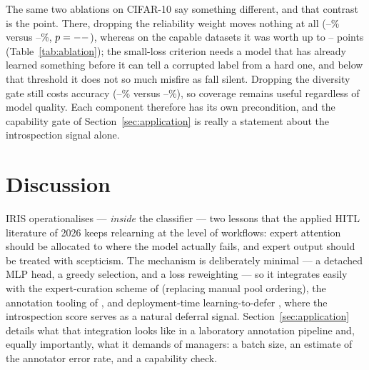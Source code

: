 \documentclass[a4paper,fleqn,longmktitle]{cas-sc}
\newcommand{\method}{IRIS}
\providecommand{\CifarCleanIrisFinal}{--}\providecommand{\CifarCleanIrisFinalStd}{--}
\providecommand{\CifarNoisyIrisFinal}{--}\providecommand{\CifarNoisyIrisFinalStd}{--}
\providecommand{\CifarCleanIrisNodivFinal}{--}\providecommand{\CifarCleanIrisNodivFinalStd}{--}
\providecommand{\CifarNoisyIrisNorelFinal}{--}\providecommand{\CifarNoisyIrisNorelFinalStd}{--}
\providecommand{\FmnistRelOnIrisGain}{--}\providecommand{\FmnistRelOnBadgeGain}{--}\providecommand{\FmnistRelOnBadgeP}{--}\providecommand{\FmnistRelOnBadgeWon}{--}\providecommand{\FmnistNoisyBadgeFinal}{--}\providecommand{\FmnistNoisyBadgeRelFinal}{--}\providecommand{\FmnistNoisyIrisNorelFinal}{--}\providecommand{\FmnistNoisyLearnlossGap}{--}\providecommand{\FmnistNoisyIrisGradFinal}{--}\providecommand{\FmnistNoisyLearnlossFinal}{--}\providecommand{\BloodRelOnIrisGain}{--}\providecommand{\BloodRelOnBadgeGain}{--}\providecommand{\BloodRelOnBadgeP}{--}\providecommand{\BloodRelOnBadgeWon}{--}\providecommand{\BloodNoisyBadgeFinal}{--}\providecommand{\BloodNoisyBadgeRelFinal}{--}\providecommand{\BloodNoisyIrisNorelFinal}{--}\providecommand{\BloodNoisyLearnlossGap}{--}\providecommand{\BloodNoisyIrisGradFinal}{--}\providecommand{\BloodNoisyLearnlossFinal}{--}\providecommand{\CifarRelOnIrisGain}{--}\providecommand{\CifarRelOnBadgeGain}{--}\providecommand{\CifarRelOnBadgeP}{--}\providecommand{\CifarRelOnBadgeWon}{--}\providecommand{\CifarNoisyBadgeFinal}{--}\providecommand{\CifarNoisyBadgeRelFinal}{--}\providecommand{\CifarNoisyIrisNorelFinal}{--}\providecommand{\CifarNoisyLearnlossGap}{--}\providecommand{\CifarNoisyIrisGradFinal}{--}\providecommand{\CifarNoisyLearnlossFinal}{--}
\begin{document}
The same two ablations on CIFAR-10 say something different, and that
contrast is the point. There, dropping the reliability weight moves
nothing at all
(\CifarNoisyIrisNorelFinal\% versus \CifarNoisyIrisFinal\%,
$p=--$), whereas on the capable datasets it was worth up to
\FmnistRelOnIrisGain{} points (Table~\ref{tab:ablation}); the small-loss criterion needs a
model that has already learned something before it can tell a corrupted
label from a hard one, and below that threshold it does not so much
misfire as fall silent. Dropping the diversity gate still costs
accuracy (\CifarCleanIrisNodivFinal\% versus \CifarCleanIrisFinal\%),
so coverage remains useful regardless of model quality. Each component
therefore has its own precondition, and the capability gate of
Section~\ref{sec:application} is really a statement about the
introspection signal alone.

\section{Discussion}\label{sec:discussion}
\method{} operationalises --- \emph{inside} the classifier --- two
lessons that the applied HITL literature of 2026 keeps relearning at
the level of workflows: expert attention should be allocated to where
the model actually fails, and expert output should be treated with
scepticism. The mechanism is deliberately minimal --- a detached MLP
head, a greedy selection, and a loss reweighting --- so it integrates
easily with the expert-curation scheme of \citet{petso2026} (replacing
manual pool ordering), the annotation tooling of \citet{piccoli2026},
and deployment-time learning-to-defer \citep{mozannar2020,alves2025},
where the introspection score serves as a natural deferral signal.
Section~\ref{sec:application} details what that integration looks like
in a laboratory annotation pipeline and, equally importantly, what it
demands of managers: a batch size, an estimate of the annotator error
rate, and a capability check.
\end{document}
